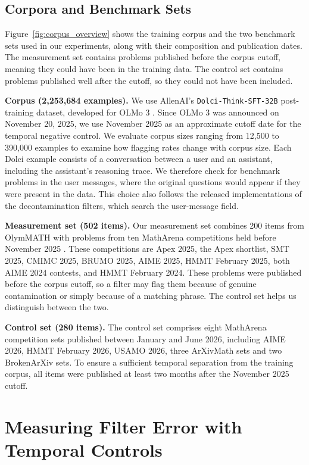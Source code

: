 \documentclass[11pt]{article}
\begin{document}
\subsection{Corpora and Benchmark Sets}
\label{sec:corpora}

Figure~\ref{fig:corpus_overview} shows the training corpus and the two benchmark sets used in our experiments, along with their composition and publication dates. The measurement set contains problems published before the corpus cutoff, meaning they could have been in the training data. The control set contains problems published well after the cutoff, so they could not have been included.

\textbf{Corpus (2,253,684 examples).} We use AllenAI's \texttt{Dolci-Think-SFT-32B} post-training dataset, developed for OLMo 3 \citep{olmo2025olmo3}. Since OLMo 3 was announced on November 20, 2025, we use November 2025 as an approximate cutoff date for the temporal negative control. We evaluate corpus sizes ranging from 12,500 to 390,000 examples to examine how flagging rates change with corpus size. Each Dolci example consists of a conversation between a user and an assistant, including the assistant's reasoning trace. We therefore check for benchmark problems in the user messages, where the original questions would appear if they were present in the data. This choice also follows the released implementations of the decontamination filters, which search the user-message field.

\textbf{Measurement set (502 items).} Our measurement set combines 200 items from OlymMATH \citep{olymmath} with problems from ten MathArena competitions held before November 2025 \citep{matharena}. These competitions are Apex 2025, the Apex shortlist, SMT 2025, CMIMC 2025, BRUMO 2025, AIME 2025, HMMT February 2025, both AIME 2024 contests, and HMMT February 2024. These problems were published before the corpus cutoff, so a filter may flag them because of genuine contamination or simply because of a matching phrase. The control set helps us distinguish between the two. 

\textbf{Control set (280 items).} The control set comprises eight MathArena competition sets published between January and June 2026, including AIME 2026, HMMT February 2026, USAMO 2026, three ArXivMath sets and two BrokenArXiv sets. To ensure a sufficient temporal separation from the training corpus, all items were published at least two months after the November 2025 cutoff.


\section{Measuring Filter Error with Temporal Controls}
\label{sec:temporal-controls}
\end{document}
